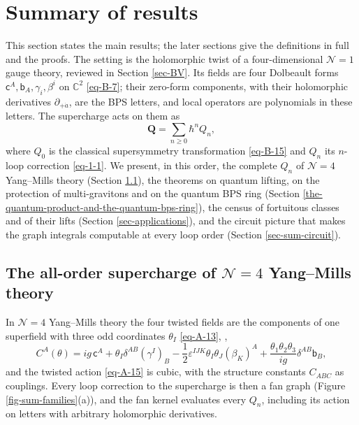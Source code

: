 \documentclass[11pt]{article}
\numberwithin{equation}{section}
\numberwithin{figure}{section}
\numberwithin{table}{section}
\begin{document}
\section{Summary of results}\label{sec-summary}

This section states the main results; the later sections give the definitions in full and the proofs. The setting is the holomorphic twist of a four-dimensional $\mathcal N=1$ gauge theory, reviewed in Section \ref{sec-BV}. Its fields are four Dolbeault forms $\mathsf c^A,\mathsf b_A,\gamma_i,\beta^i$ on $\mathbb C^2$ \eqref{eq-B-7}; their zero-form components, with their holomorphic derivatives $\partial_{+\dot a}$, are the BPS letters, and local operators are polynomials in these letters. The supercharge acts on them as
\begin{equation*}
\mathbf Q=\sum_{n\ge0}\hbar^nQ_n,
\end{equation*}
where $Q_0$ is the classical supersymmetry transformation \eqref{eq-B-15} and $Q_n$ its $n$-loop correction \eqref{eq-1-1}. We present, in this order, the complete $Q_n$ of $\mathcal N=4$ Yang--Mills theory (Section \ref{the-all-order-supercharge-of-mathcal-n4-yangmills-theory}), the theorems on quantum lifting, on the protection of multi-gravitons and on the quantum BPS ring (Section \ref{the-quantum-product-and-the-quantum-bps-ring}), the census of fortuitous classes and of their lifts (Section \ref{sec-applications}), and the circuit picture that makes the graph integrals computable at every loop order (Section \ref{sec-sum-circuit}).

\subsection{The all-order supercharge of $\mathcal N=4$ Yang--Mills theory}\label{the-all-order-supercharge-of-mathcal-n4-yangmills-theory}

In $\mathcal N=4$ Yang--Mills theory the four twisted fields are the components of one superfield with three odd coordinates $\theta_I$ \eqref{eq-A-13}, \cite{ChangYin,BK},
\begin{equation*}
C^A(\theta)=ig\,\mathsf c^A+\theta_I\delta^{AB}(\gamma^I)_B-\frac12\varepsilon^{IJK}\theta_I\theta_J(\beta_K)^A+\frac{\theta_1\theta_2\theta_3}{ig}\delta^{AB}\mathsf b_B,
\end{equation*}
and the twisted action \eqref{eq-A-15} is cubic, with the structure constants $C_{ABC}$ as couplings. Every loop correction to the supercharge is then a fan graph (Figure \ref{fig-sum-families}(a)), and the fan kernel evaluates every $Q_n$, including its action on letters with arbitrary holomorphic derivatives.
\end{document}
